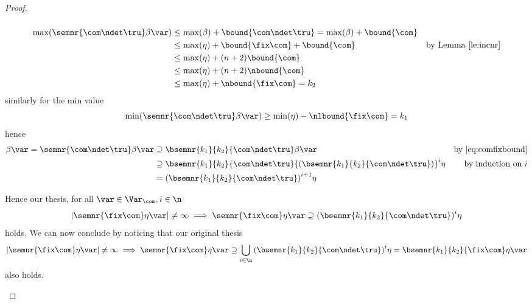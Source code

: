 \begin{proof}
\begin{inductive}
\begin{description}
\begin{equation}
      \end{equation}
      \begin{align*}
        \max(\semnr{\com\ndet\tru}\beta\var) & \leq \max(\beta) + \bound{\com\ndet\tru} = \max(\beta) + \bound{\com} \\
                                             & \leq \max(\eta) + \bound{\fix\com} + \bound{\com} & \text{by Lemma~\ref{le:incnr}} \\
                                             & \leq \max(\eta) + (n+2)\bound{\com} \\
                                             & \leq \max(\eta) + (n+2)\nbound{\com} \\
                                             & \leq \max(\eta) + \nbound{\fix\com} = k_2
      \end{align*}
      similarly for the min value
      \begin{equation*}
        \min(\semnr{\com\ndet\tru}\beta\var) \geq \min(\eta) - \nlbound{\fix\com} = k_1
      \end{equation*}
      hence
      \begin{align*}
        \beta\var = \semnr{\com\ndet\tru}\beta\var & \supseteq \bsemnr{k_1}{k_2}{\com\ndet\tru}\beta\var & \text{by~\eqref{eq:comfixbound}}\\
                                                   & \supseteq \bsemnr{k_1}{k_2}{\com\ndet\tru}{\left(\bsemnr{k_1}{k_2}{\com\ndet\tru}\right)}^i\eta & \text{by induction on } i\\
                                                   & = {\left(\bsemnr{k_1}{k_2}{\com\ndet\tru}\right)}^{i+1}\eta
      \end{align*}
    \end{description}
    Hence our thesis, for all \(\var \in \Var_{\com}, i \in \n\)
    \begin{equation*}
      |\semnr{\fix\com}\eta\var| \neq \infty \implies
      \semnr{\fix\com}\eta\var \supseteq
      {\left(\bsemnr{k_1}{k_2}{\com\ndet\tru}\right)}^i\eta
    \end{equation*}
    holds.  We can now conclude by noticing that our original thesis
    \begin{equation*}
      |\semnr{\fix\com}\eta\var| \neq \infty \implies
      \semnr{\fix\com}\eta\var \supseteq
      \bigcup_{i\in\n}{\left(\bsemnr{k_1}{k_2}{\com\ndet\tru}\right)}^i\eta =
      \bsemnr{k_1}{k_2}{\fix\com}\eta\var
    \end{equation*}
    also holds.
  \end{inductive}
\end{proof}

